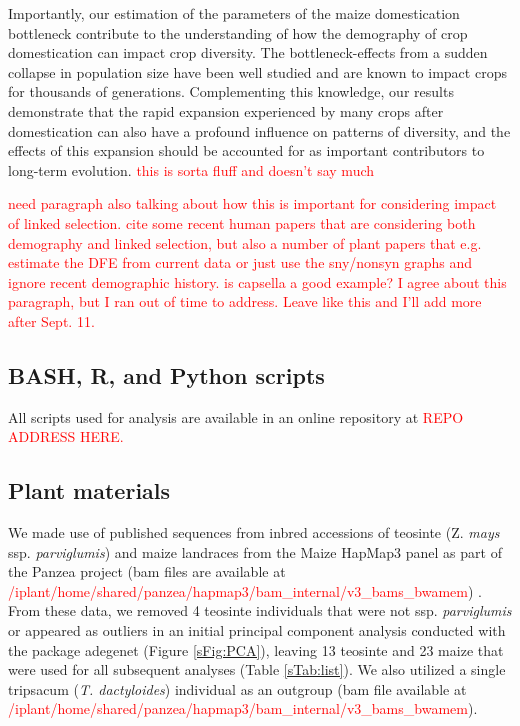 \documentclass{pnastwo}
\newcommand{\jri}[1]{\textcolor{red}{\scriptsize #1}}
\begin{document}
\begin{article}
 Importantly, our estimation of the parameters of the maize domestication bottleneck contribute to the understanding of how the demography of crop domestication can impact crop diversity. The bottleneck-effects from a sudden collapse in population size have been well studied and are known to impact crops for thousands of generations. Complementing this knowledge, our results demonstrate that the rapid expansion experienced by many crops after domestication can also have a profound influence on patterns of diversity, and the effects of this expansion should be accounted for as important contributors to long-term evolution. \jri{this is sorta fluff and doesn't say much} 

\jri{need paragraph also talking about how this is important for considering impact of linked selection. cite some recent human papers that are considering both demography and linked selection, but also a number of plant papers that e.g. estimate the DFE from current data or just use the sny/nonsyn graphs and ignore recent demographic history. is capsella a good example? } \textcolor{red}{I agree about this paragraph, but I ran out of time to address. Leave like this and I'll add more after Sept. 11.}

\begin{materials}

  \subsection{BASH, R, and Python scripts}
All scripts used for analysis are available in an online repository at \textcolor{red}{REPO ADDRESS HERE.} 

\subsection{Plant materials}
We made use of published sequences from inbred accessions of teosinte (Z. \emph{mays} ssp. \emph{parviglumis}) and maize landraces from the Maize HapMap3 panel as part of the Panzea project (bam files are available at \textcolor{red}{/iplant/home/shared/panzea/hapmap3/bam\_internal/v3\_bams\_bwamem}) \cite{chia2012, lemmon2014,hapmap3}. 
From these data, we removed 4 teosinte individuals that were not ssp. \emph{parviglumis} or appeared as outliers in an initial principal component analysis conducted with the package adegenet \cite{jombart2011} (Figure \ref{sFig:PCA}), leaving 13 teosinte and 23 maize that were used for all subsequent analyses (Table \ref{sTab:list}). We also utilized a single tripsacum (\emph{T. dactyloides}) individual as an outgroup (bam file available at \textcolor{red}{/iplant/home/shared/panzea/hapmap3/bam\_internal/v3\_bams\_bwamem}).


\end{materials}
\end{article}
\end{document}
